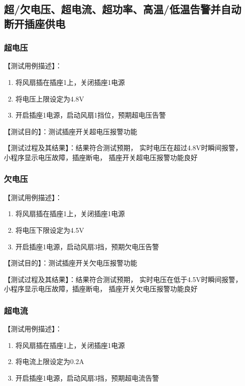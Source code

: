 \documentclass[10.5pt]{config}
\begin{document}
\subsection{超/欠电压、超电流、超功率、高温/低温告警并自动断开插座供电}
\subsubsection{超电压}

【测试用例描述】：
\begin{enumerate}
  \item 将风扇插在插座1上，关闭插座1电源
  \item 将电压上限设定为4.8V
  \item 开启插座1电源，启动风扇1挡位，预期超电压告警
\end{enumerate}

【测试目的】：测试插座开关超电压报警功能

【测试过程及其结果】：结果符合测试预期，
实时电压在超过4.8V时瞬间报警，
小程序显示电压故障，插座断电，
插座开关超电压报警功能良好

\subsubsection{欠电压}

【测试用例描述】：
\begin{enumerate}
  \item 将风扇插在插座1上，关闭插座1电源
  \item 将电压下限设定为4.5V
  \item 开启插座1电源，启动风扇3挡，预期欠电压告警
\end{enumerate}

【测试目的】：测试插座开关欠电压报警功能

【测试过程及其结果】：结果符合测试预期，
实时电压在低于4.5V时瞬间报警，
小程序显示电压故障，插座断电，
插座开关欠电压报警功能良好

\subsubsection{超电流}

【测试用例描述】：
\begin{enumerate}
  \item 将风扇插在插座1上，关闭插座1电源
  \item 将电流上限设定为0.2A
  \item 开启插座1电源，启动风扇3挡，预期超电流告警
\end{enumerate}
\end{document}
